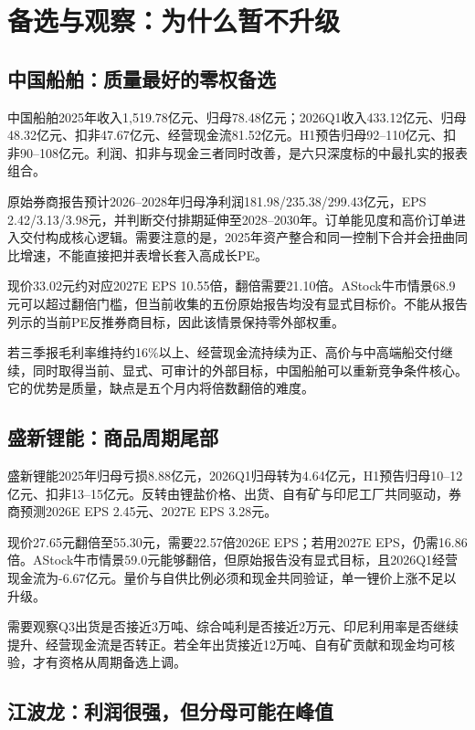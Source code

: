 \chapter{备选与观察：为什么暂不升级}

\section{中国船舶：质量最好的零权备选}

中国船舶2025年收入1,519.78亿元、归母78.48亿元；2026Q1收入433.12亿元、归母48.32亿元、扣非47.67亿元、经营现金流81.52亿元。H1预告归母92--110亿元、扣非90--108亿元。利润、扣非与现金三者同时改善，是六只深度标的中最扎实的报表组合。

原始券商报告预计2026--2028年归母净利润181.98/235.38/299.43亿元，EPS 2.42/3.13/3.98元，并判断交付排期延伸至2028--2030年。订单能见度和高价订单进入交付构成核心逻辑。需要注意的是，2025年资产整合和同一控制下合并会扭曲同比增速，不能直接把并表增长套入高成长PE。

现价33.02元约对应2027E EPS 10.55倍，翻倍需要21.10倍。AStock牛市情景68.9元可以超过翻倍门槛，但当前收集的五份原始报告均没有显式目标价。不能从报告列示的当前PE反推券商目标，因此该情景保持零外部权重。

\begin{keyinsight}[升级条件]
若三季报毛利率维持约16\%以上、经营现金流持续为正、高价与中高端船交付继续，同时取得当前、显式、可审计的外部目标，中国船舶可以重新竞争条件核心。它的优势是质量，缺点是五个月内将倍数翻倍的难度。
\end{keyinsight}

\section{盛新锂能：商品周期尾部}

盛新锂能2025年归母亏损8.88亿元，2026Q1归母转为4.64亿元，H1预告归母10--12亿元、扣非13--15亿元。反转由锂盐价格、出货、自有矿与印尼工厂共同驱动，券商预测2026E EPS 2.45元、2027E EPS 3.28元。

现价27.65元翻倍至55.30元，需要22.57倍2026E EPS；若用2027E EPS，仍需16.86倍。AStock牛市情景59.0元能够翻倍，但原始报告没有显式目标，且2026Q1经营现金流为-6.67亿元。量价与自供比例必须和现金共同验证，单一锂价上涨不足以升级。

需要观察Q3出货是否接近3万吨、综合吨利是否接近2万元、印尼利用率是否继续提升、经营现金流是否转正。若全年出货接近12万吨、自有矿贡献和现金均可核验，才有资格从周期备选上调。

\section{江波龙：利润很强，但分母可能在峰值}

